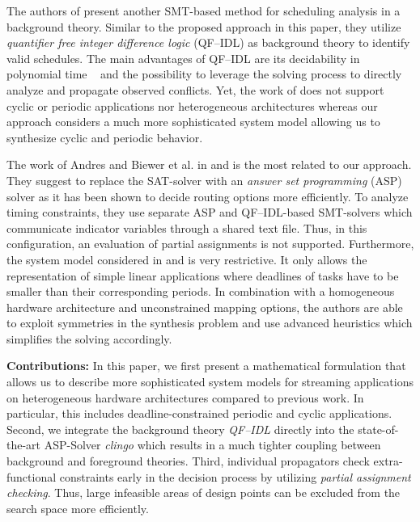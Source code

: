 The authors of \cite{Liu2011} present another SMT-based method for scheduling analysis in a background theory. 
Similar to the proposed approach in this paper, they utilize \emph{quantifier free integer difference logic} (QF--IDL) as background theory to identify valid schedules. 
The main advantages of QF--IDL are its decidability in polynomial time%
~\cite{Sebastiani2007} and the possibility to leverage the solving process to directly analyze and propagate observed conflicts. 
Yet, the work of \cite{Liu2011} does not support cyclic or periodic applications nor heterogeneous architectures whereas our approach considers a much more sophisticated system model allowing us to synthesize cyclic and periodic behavior.
\par The work of Andres and Biewer et al. in \cite{Andres2015} and \cite{Biewer2015} is the most related to our approach. 
They suggest to replace the SAT-solver with an \emph{answer set programming} (ASP) solver as it has been shown to decide routing options more efficiently. 
To analyze timing constraints, they use separate ASP and QF--IDL-based SMT-solvers which communicate indicator variables through a shared text file. 
Thus, in this configuration, an evaluation of partial assignments is not supported.
Furthermore, the system model considered in \cite{Andres2015} and \cite{Biewer2015} is very restrictive. It only allows the representation of simple linear applications where deadlines of tasks have to be smaller than their corresponding periods. 
In combination with a homogeneous hardware architecture and unconstrained mapping options, the authors are able to exploit symmetries in the synthesis problem and use advanced heuristics which simplifies the solving accordingly.

\textbf{Contributions:} In this paper, we first present a mathematical formulation that allows us to describe more sophisticated system models for streaming applications on heterogeneous hardware architectures compared to previous work. 
In particular, this includes deadline-constrained periodic and cyclic applications. Second, we integrate the background theory \emph{QF--IDL} directly into the state-of-the-art ASP-Solver \emph{clingo} \cite{gekakaosscwa16a} which results in a much tighter coupling between background and foreground theories. Third, individual propagators check extra-functional constraints early in the decision process by utilizing \emph{partial assignment checking}. Thus, large infeasible areas of design points can be excluded from the search space more efficiently.

